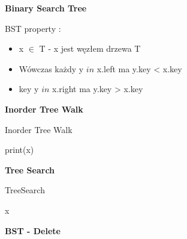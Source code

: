\documentclass{article}
\begin{document}
    \vspace{1\baselineskip}
    \textbf{Binary Search Tree} \par
    BST property : \par
    \begin{itemize}
        \item x $\in$ T - x jest węzłem drzewa T
        \item Wówczas każdy y $in$ x.left ma y.key < x.key
        \item key y $in$ x.right ma y.key > x.key
    \end{itemize}
    \vspace{1\baselineskip}
    \textbf{Inorder Tree Walk} \par
    \begin{algorithm}[H]
        \caption{Inorder Tree Walk}\label{alg:inorder_tree_walk}
        \begin{algorithmic}[1]
                \State {}
                \State print(x)
                \State {}
            \EndIf
        \EndProcedure
        \end{algorithmic}
    \end{algorithm}
    \newpage
    \textbf{Tree Search} \par
    \begin{algorithm}[H]
        \caption{TreeSearch}\label{alg:tree_search}
        \begin{algorithmic}[1]
                \State \Return x
                \State \Return {}
            \Else
                \State \Return {}
            \EndIf
        \EndProcedure
        \end{algorithmic}
    \end{algorithm}
    \vspace{1\baselineskip}
    \textbf{BST - Delete} \par
\end{document}
